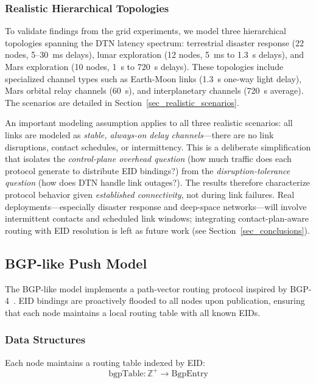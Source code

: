 \documentclass[journal,twocolumn]{IEEEtran}
\begin{document}
\subsubsection{Realistic Hierarchical Topologies}

To validate findings from the grid experiments, we model three hierarchical topologies spanning the DTN latency spectrum: terrestrial disaster response (22 nodes, 5--30~ms delays), lunar exploration (12 nodes, 5~ms to 1.3~s delays), and Mars exploration (10 nodes, 1~s to 720~s delays).
These topologies include specialized channel types such as Earth-Moon links (1.3~s one-way light delay), Mars orbital relay channels (60~s), and interplanetary channels (720~s average).
The scenarios are detailed in Section~\ref{sec_realistic_scenarios}.

An important modeling assumption applies to all three realistic scenarios: all links are modeled as \emph{stable, always-on delay channels}---there are no link disruptions, contact schedules, or intermittency. This is a deliberate simplification that isolates the \emph{control-plane overhead question} (how much traffic does each protocol generate to distribute EID bindings?) from the \emph{disruption-tolerance question} (how does DTN handle link outages?). The results therefore characterize protocol behavior given \emph{established connectivity}, not during link failures. Real deployments---especially disaster response and deep-space networks---will involve intermittent contacts and scheduled link windows; integrating contact-plan-aware routing with EID resolution is left as future work (see Section~\ref{sec_conclusions}).

\subsection{BGP-like Push Model}
\label{sec_bgp_model}

The BGP-like model implements a path-vector routing protocol inspired by BGP-4~\cite{rfc4271}. 
EID bindings are proactively flooded to all nodes upon publication, ensuring that each node maintains a local routing table with all known EIDs.

\subsubsection{Data Structures}

Each node maintains a routing table indexed by EID:
\begin{equation}
\text{bgpTable}: \mathbb{Z}^+ \to \text{BgpEntry}
\end{equation}
\end{document}
